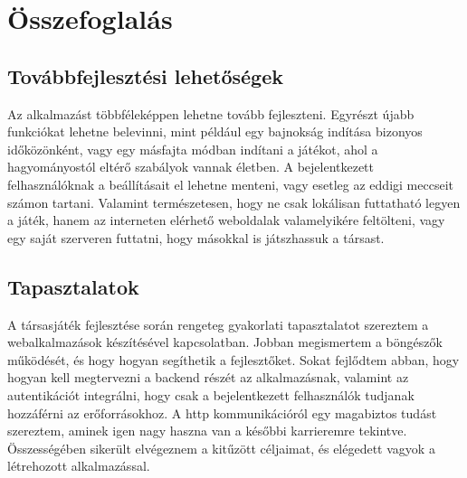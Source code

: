 \documentclass[a4paper,twoside]{article}
\begin{document}
\section{Összefoglalás}
\subsection{Továbbfejlesztési lehetőségek}
Az alkalmazást többféleképpen lehetne tovább fejleszteni. Egyrészt újabb funkciókat lehetne belevinni, mint például egy bajnokság indítása bizonyos időközönként, vagy egy másfajta módban indítani a játékot, ahol a hagyományostól eltérő szabályok vannak életben. A bejelentkezett felhasználóknak a  beállításait el lehetne menteni, vagy esetleg az eddigi meccseit számon tartani. Valamint természetesen, hogy ne csak lokálisan futtatható legyen a játék, hanem az interneten elérhető weboldalak valamelyikére feltölteni, vagy egy saját szerveren futtatni, hogy másokkal is játszhassuk a társast. 
\subsection{Tapasztalatok}
A társasjáték fejlesztése során rengeteg gyakorlati tapasztalatot szereztem a webalkalmazások készítésével kapcsolatban. Jobban megismertem a böngészők működését, és hogy hogyan segíthetik a fejlesztőket. Sokat fejlődtem abban, hogy hogyan kell megtervezni a backend részét az alkalmazásnak, valamint az autentikációt integrálni, hogy csak a bejelentkezett felhasználók tudjanak hozzáférni az erőforrásokhoz. A http kommunikációról egy magabiztos tudást szereztem, aminek igen nagy haszna van a későbbi karrieremre tekintve. Összességében sikerült elvégeznem a kitűzött céljaimat, és elégedett vagyok a létrehozott alkalmazással.


\newpage
\end{document}
